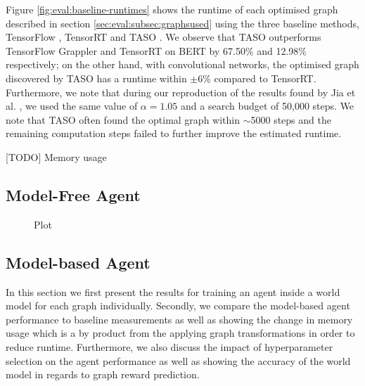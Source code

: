 Figure \ref{fig:eval:baseline-runtimes} shows the runtime of each optimised graph described in section \ref{sec:eval:subsec:graphsused} using the three baseline methods, TensorFlow \cite{tensorflow2015-whitepaper}, TensorRT \cite{tensorrt2017} and TASO \cite{jia2019taso}. We observe that TASO outperforms TensorFlow Grappler and TensorRT on BERT by 67.50\% and 12.98\% respectively; on the other hand, with convolutional networks, the optimised graph discovered by TASO has a runtime within $\pm 6$\% compared to TensorRT. Furthermore, we note that during our reproduction of the results found by Jia et al. \cite{jia2019taso}, we used the same value of $\alpha = 1.05$ and a search budget of 50,000 steps. We note that TASO often found the optimal graph within $\sim$5000 steps and the remaining computation steps failed to further improve the estimated runtime.

[TODO] Memory usage


\subsection{Model-Free Agent}
\label{sec:eval:subsec:mfagent}



\begin{figure}[ht]
  \centering
  \caption[Epoch reward for model-free agent produced by real environment]{Plot}
  \label{fig:eval:mf-agent-reward}
\end{figure}

\subsection{Model-based Agent}
\label{sec:eval:subsec:mbagent}

In this section we first present the results for training an agent inside a world model for each graph individually. Secondly, we compare the model-based agent performance to baseline measurements as well as showing the change in memory usage which is a by product from the applying graph transformations in order to reduce runtime. Furthermore, we also discuss the impact of hyperparameter selection on the agent performance as well as showing the accuracy of the world model in regards to graph reward prediction.


